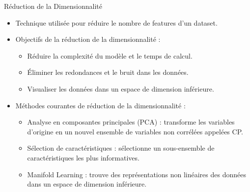 \documentclass{beamer}
\begin{document}
\begin{frame}{Réduction de la Dimensionnalité}
	\begin{itemize}
		\item Technique utilisée pour réduire le nombre de features d'un dataset.
		\item Objectifs de la réduction de la dimensionnalité :
		\begin{itemize}
			\item Réduire la complexité du modèle et le temps de calcul.
			\item Éliminer les redondances et le bruit dans les données.
			\item Visualiser les données dans un espace de dimension inférieure.
		\end{itemize}
		\item Méthodes courantes de réduction de la dimensionnalité :
		\begin{itemize}
			\item Analyse en composantes principales (PCA) : transforme les variables d'origine en un nouvel ensemble de variables non corrélées appelées CP.
			\item Sélection de caractéristiques : sélectionne un sous-ensemble de caractéristiques les plus informatives.
			\item Manifold Learning : trouve des représentations non linéaires des données dans un espace de dimension inférieure.
		\end{itemize}
	\end{itemize}
\end{frame}
\end{document}

